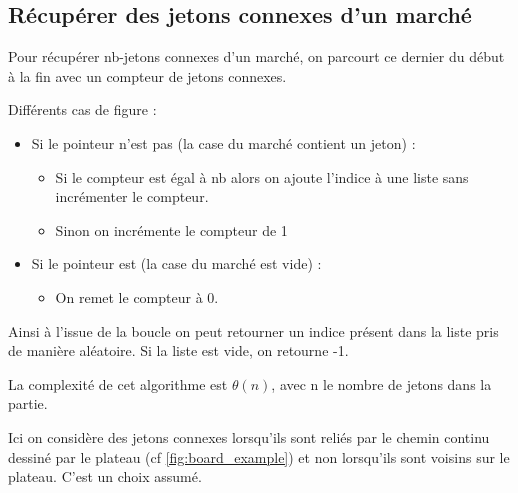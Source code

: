 \subsection{Récupérer des jetons connexes d'un marché}
\label{linkedtokens}

Pour récupérer nb-jetons connexes d'un marché, on parcourt ce dernier du début à la fin avec un compteur de jetons connexes.

\noindent Différents cas de figure :
\begin{itemize}
    \item Si le pointeur n'est pas  (la case du marché contient un jeton) :
    \begin{itemize}
        \item Si le compteur est égal à nb alors on ajoute l'indice à une liste sans incrémenter le compteur.
        \item Sinon on incrémente le compteur de 1
    \end{itemize}
    \item Si le pointeur est  (la case du marché est vide) :
    \begin{itemize}
        \item On remet le compteur à 0.
    \end{itemize}
\end{itemize}

Ainsi à l'issue de la boucle on peut retourner un indice présent dans la liste pris de manière aléatoire. Si la liste est vide, on retourne -1.

La complexité de cet algorithme est $\theta(n)$, avec n le nombre de jetons dans la partie.

\begin{summary}
Ici on considère des jetons connexes lorsqu'ils sont reliés par le chemin continu dessiné par le plateau (cf \ref{fig:board_example}) et non lorsqu'ils sont voisins sur le plateau. C'est un choix assumé.
\end{summary}